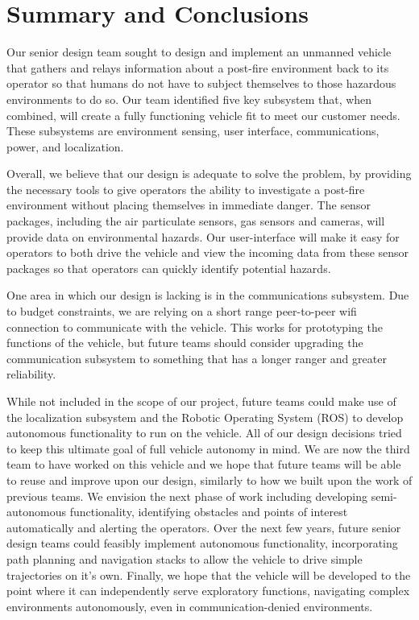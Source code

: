 \chapter{Summary and Conclusions}

Our senior design team sought to design and implement an unmanned vehicle that gathers and relays information about a post-fire environment back to its operator so that humans do not have to subject themselves to those hazardous environments to do so. Our team identified five key subsystem that, when combined, will create a fully functioning vehicle fit to meet our customer needs.  These subsystems are environment sensing, user interface, communications, power, and localization.

Overall, we believe that our design is adequate to solve the problem, by providing the necessary tools to give operators the ability to investigate a post-fire environment without placing themselves in immediate danger. The sensor packages, including the air particulate sensors, gas sensors and cameras, will provide data on environmental hazards.  Our user-interface will make it easy for operators to both drive the vehicle and view the incoming data from these sensor packages so that operators can quickly identify potential hazards.

One area in which our design is lacking is in the communications subsystem.  Due to budget constraints, we are relying on a short range peer-to-peer wifi connection to communicate with the vehicle.  This works for prototyping the functions of the vehicle, but future teams should consider upgrading the communication subsystem to something that has a longer ranger and greater reliability.  

While not included in the scope of our project, future teams could make use of the localization subsystem and the Robotic Operating System (ROS) to develop autonomous functionality to run on the vehicle. All of our design decisions tried to keep this ultimate goal of full vehicle autonomy in mind. We are now the third team to have worked on this vehicle and we hope that future teams will be able to reuse and improve upon our design, similarly to how we built upon the work of previous teams. We envision the next phase of work including developing semi-autonomous functionality, identifying obstacles and points of interest automatically and alerting the operators. Over the next few years, future senior design teams could feasibly implement autonomous functionality, incorporating path planning and navigation stacks to allow the vehicle to drive simple trajectories on it's own. Finally, we hope that the vehicle will be developed to the point where it can independently serve exploratory functions, navigating complex environments autonomously, even in communication-denied environments.

